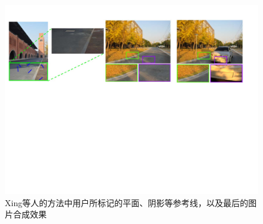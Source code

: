 \begin{figure}[!htbp]
    \centering
    \includegraphics[width=1.0\textwidth]{Img/user-aux.pdf}

    \caption[用户标记辅助估计光照]
    {Xing等人\cite{xing2013lighting}的方法中用户所标记的平面、阴影等参考线，以及最后的图片合成效果}
    
    \label{fig:user-aux}
\end{figure}